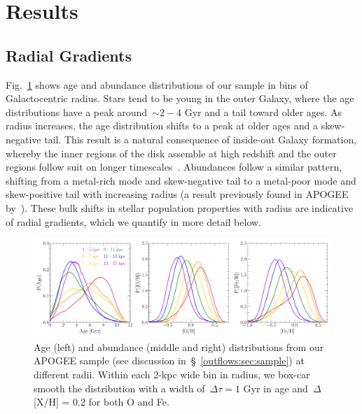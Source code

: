 
\section{Results}
\label{outflows:sec:results}

\subsection{Radial Gradients}
\label{outflows:sec:results:gradients}

Fig.~\ref{outflows:fig:age-xh-dists} shows age and abundance distributions of
our sample in bins of Galactocentric radius.
Stars tend to be young in the outer Galaxy, where the age distributions have a
peak around~$\sim$$2-4$ Gyr and a tail toward older ages.
As radius increases, the age distribution shifts to a peak at older ages and a
skew-negative tail.
This result is a natural consequence of inside-out Galaxy formation, whereby
the inner regions of the disk assemble at high redshift and the outer regions
follow suit on longer timescales~\citep[e.g.,][]{White1991, Bird2013}.
Abundances follow a similar pattern, shifting from a metal-rich mode and
skew-negative tail to a metal-poor mode and skew-positive tail with increasing
radius (a result previously found in APOGEE by~\citealt{Hayden2015}).
These bulk shifts in stellar population properties with radius are indicative
of radial gradients, which we quantify in more detail below.

\begin{landscape}
\begin{figure}
\centering
\includegraphics[scale = 0.55]{age_xh_dists.pdf}
\caption{
Age (left) and abundance (middle and right) distributions from our APOGEE
sample (see discussion in~\S~\ref{outflows:sec:sample}) at different
radii.
Within each 2-kpc wide bin in radius, we box-car smooth the distribution with a
width of~$\Delta \tau = 1$ Gyr in age and~$\Delta$[X/H] = 0.2 for both O and
Fe.
}
\label{outflows:fig:age-xh-dists}
\end{figure}
\end{landscape}

